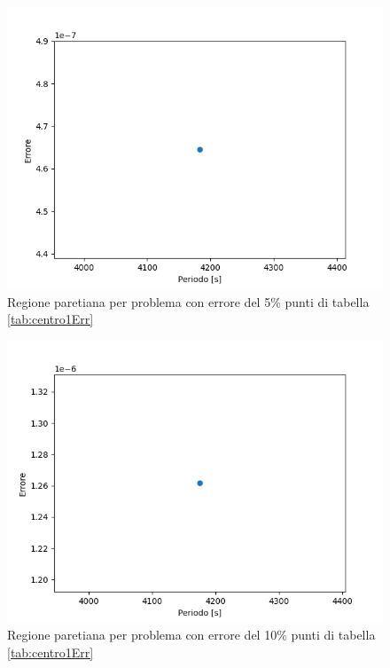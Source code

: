 \documentclass[a4paper,12pt]{report}
\begin{document}
\begin{itemize}
  \begin{figure}[H]
    \centering
    \includegraphics[scale=0.70]{img/puls005/standard10_err5.png}
    \caption{Regione paretiana per problema con errore del 5\% punti di tabella \ref{tab:centro1Err}}
    \label{fig:reg_ammis_5_005_std_err}
  \end{figure}

  \begin{figure}[H]
    \centering
    \includegraphics[scale=0.70]{img/puls005/standard10_err10.png}
    \caption{Regione paretiana per problema con errore del 10\% punti di tabella \ref{tab:centro1Err}}
    \label{fig:reg_ammis_10_005_std_err}
  \end{figure}


\end{itemize}
\end{document}

